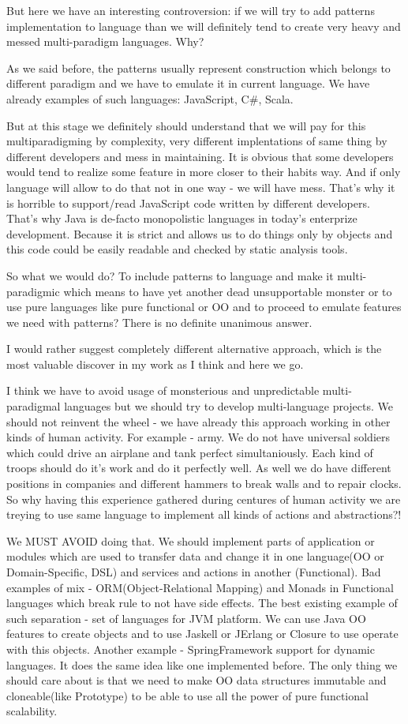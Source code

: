 But here we have an interesting controversion: if we will try to add patterns implementation to language than we will definitely tend to create very heavy and messed multi-paradigm languages. Why?

As we said before, the patterns usually represent construction which belongs to different paradigm and we have to emulate it in current language. We have already examples of such languages: JavaScript, C\#, Scala.

But at this stage we definitely should understand that we will pay for this multiparadigming by complexity, very different implentations of same thing by different developers and mess in maintaining. It is obvious that some developers would tend to realize some feature in more closer to their habits way. And if only language will allow to do that not in one way - we will have mess. That's why it is horrible to support/read JavaScript code written by different developers. That's why Java is de-facto monopolistic languages in today's enterprize development. Because it is strict and allows us to do things only by objects and this code could be easily readable and checked by static analysis tools.

So what we would do? To include patterns to language and make it multi-paradigmic which means to have yet another dead unsupportable monster or to use pure languages like pure functional or OO and to proceed to emulate features we need with patterns? There is no definite unanimous answer.

I would rather suggest completely different alternative approach, which is the most valuable discover in my work as I think and here we go.

I think we have to avoid usage of monsterious and unpredictable multi-paradigmal languages but we should try to develop multi-language projects. We should not reinvent the wheel - we have already this approach working in other kinds of human activity. For example - army. We do not have universal soldiers which could drive an airplane and tank perfect simultaniously. Each kind of troops should do it's work and do it perfectly well. As well we do have different positions in companies and different hammers to break walls and to repair clocks. So why having this experience gathered during centures of human activity we are treying to use same language to implement all kinds of actions and abstractions?!

We MUST AVOID doing that. We should implement parts of application or modules which are used to transfer data and change it in one language(OO or Domain-Specific, DSL) and services and actions in another (Functional). Bad examples of mix - ORM(Object-Relational Mapping) and Monads in Functional languages which break rule to not have side effects. The best existing example of such separation - set of languages for JVM platform. We can use Java OO features to create objects and to use Jaskell or JErlang or Closure to use operate with this objects. Another example - SpringFramework support for dynamic languages. It does the same idea like one implemented before. The only thing we should care about is that we need to make OO data structures immutable and cloneable(like Prototype) to be able to use all the power of pure functional scalability.

